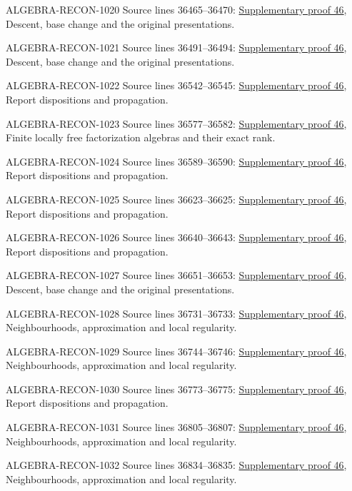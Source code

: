 \begin{AlgebraSourceRoutes}
\item[ALGEBRA-RECON-1020] Source lines 36465--36470: \hyperlink{algebra_syntomic_notes_20260928}{Supplementary proof 46}, Descent, base change and the original presentations.
\item[ALGEBRA-RECON-1021] Source lines 36491--36494: \hyperlink{algebra_syntomic_notes_20260928}{Supplementary proof 46}, Descent, base change and the original presentations.
\item[ALGEBRA-RECON-1022] Source lines 36542--36545: \hyperlink{algebra_syntomic_notes_20260928}{Supplementary proof 46}, Report dispositions and propagation.
\item[ALGEBRA-RECON-1023] Source lines 36577--36582: \hyperlink{algebra_syntomic_notes_20260928}{Supplementary proof 46}, Finite locally free factorization algebras and their exact rank.
\item[ALGEBRA-RECON-1024] Source lines 36589--36590: \hyperlink{algebra_syntomic_notes_20260928}{Supplementary proof 46}, Report dispositions and propagation.
\item[ALGEBRA-RECON-1025] Source lines 36623--36625: \hyperlink{algebra_syntomic_notes_20260928}{Supplementary proof 46}, Report dispositions and propagation.
\item[ALGEBRA-RECON-1026] Source lines 36640--36643: \hyperlink{algebra_syntomic_notes_20260928}{Supplementary proof 46}, Report dispositions and propagation.
\item[ALGEBRA-RECON-1027] Source lines 36651--36653: \hyperlink{algebra_syntomic_notes_20260928}{Supplementary proof 46}, Descent, base change and the original presentations.
\item[ALGEBRA-RECON-1028] Source lines 36731--36733: \hyperlink{algebra_syntomic_notes_20260928}{Supplementary proof 46}, Neighbourhoods, approximation and local regularity.
\item[ALGEBRA-RECON-1029] Source lines 36744--36746: \hyperlink{algebra_syntomic_notes_20260928}{Supplementary proof 46}, Neighbourhoods, approximation and local regularity.
\item[ALGEBRA-RECON-1030] Source lines 36773--36775: \hyperlink{algebra_syntomic_notes_20260928}{Supplementary proof 46}, Report dispositions and propagation.
\item[ALGEBRA-RECON-1031] Source lines 36805--36807: \hyperlink{algebra_syntomic_notes_20260928}{Supplementary proof 46}, Neighbourhoods, approximation and local regularity.
\item[ALGEBRA-RECON-1032] Source lines 36834--36835: \hyperlink{algebra_syntomic_notes_20260928}{Supplementary proof 46}, Neighbourhoods, approximation and local regularity.

\end{AlgebraSourceRoutes}
